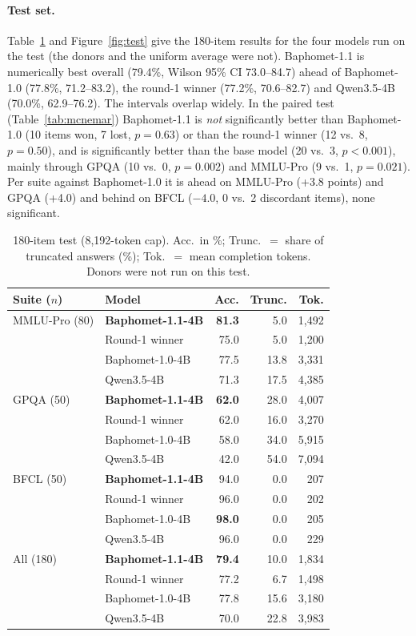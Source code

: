 \paragraph{Test set.} Table~\ref{tab:test} and Figure~\ref{fig:test} give the 180-item results for the four models run on the test (the donors and the uniform average were not). Baphomet-1.1 is numerically best overall (79.4\%, Wilson 95\% CI 73.0--84.7) ahead of Baphomet-1.0 (77.8\%, 71.2--83.2), the round-1 winner (77.2\%, 70.6--82.7) and Qwen3.5-4B (70.0\%, 62.9--76.2). The intervals overlap widely. In the paired test (Table~\ref{tab:mcnemar}) Baphomet-1.1 is \emph{not} significantly better than Baphomet-1.0 (10 items won, 7 lost, $p=0.63$) or than the round-1 winner (12 vs.\ 8, $p=0.50$), and is significantly better than the base model (20 vs.\ 3, $p<0.001$), mainly through GPQA (10 vs.\ 0, $p=0.002$) and MMLU-Pro (9 vs.\ 1, $p=0.021$). Per suite against Baphomet-1.0 it is ahead on MMLU-Pro (+3.8 points) and GPQA (+4.0) and behind on BFCL ($-4.0$, 0 vs.\ 2 discordant items), none significant.

\begin{table}[htbp]
\centering\small
\caption{180-item test (8{,}192-token cap). Acc.\ in \%; Trunc.\ $=$ share of truncated answers (\%); Tok.\ $=$ mean completion tokens. Donors were not run on this test.}
\label{tab:test}
\setlength{\tabcolsep}{4pt}
\begin{tabular}{llrrr}
\toprule
Suite ($n$) & Model & Acc. & Trunc. & Tok. \\
\midrule
MMLU-Pro (80) & \textbf{Baphomet-1.1-4B} & \textbf{81.3} & 5.0 & 1{,}492 \\
 & Round-1 winner & 75.0 & 5.0 & 1{,}200 \\
 & Baphomet-1.0-4B & 77.5 & 13.8 & 3{,}331 \\
 & Qwen3.5-4B & 71.3 & 17.5 & 4{,}385 \\
\midrule
GPQA (50) & \textbf{Baphomet-1.1-4B} & \textbf{62.0} & 28.0 & 4{,}007 \\
 & Round-1 winner & 62.0 & 16.0 & 3{,}270 \\
 & Baphomet-1.0-4B & 58.0 & 34.0 & 5{,}915 \\
 & Qwen3.5-4B & 42.0 & 54.0 & 7{,}094 \\
\midrule
BFCL (50) & \textbf{Baphomet-1.1-4B} & 94.0 & 0.0 & 207 \\
 & Round-1 winner & 96.0 & 0.0 & 202 \\
 & Baphomet-1.0-4B & \textbf{98.0} & 0.0 & 205 \\
 & Qwen3.5-4B & 96.0 & 0.0 & 229 \\
\midrule
All (180) & \textbf{Baphomet-1.1-4B} & \textbf{79.4} & 10.0 & 1{,}834 \\
 & Round-1 winner & 77.2 & 6.7 & 1{,}498 \\
 & Baphomet-1.0-4B & 77.8 & 15.6 & 3{,}180 \\
 & Qwen3.5-4B & 70.0 & 22.8 & 3{,}983 \\
\bottomrule
\end{tabular}
\end{table}

